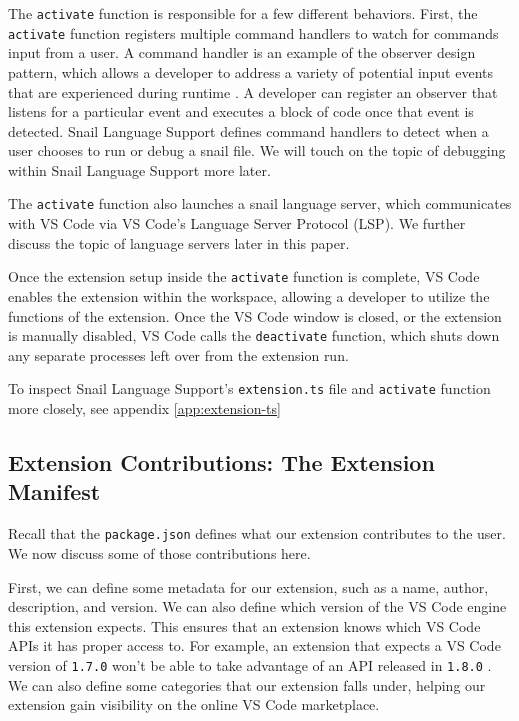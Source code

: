 \documentclass{article}
\begin{document}
The \lstinline{activate} function is responsible for a few different behaviors. First, the \lstinline{activate} function registers multiple command handlers to watch for commands input from a user. A command handler is an example of the observer design pattern, which allows a developer to address a variety of potential input events that are experienced during runtime \cite{GangOfFour_1995}. A developer can register an observer that listens for a particular event and executes a block of code once that event is detected. Snail Language Support defines command handlers to detect when a user chooses to run or debug a snail file. We will touch on the topic of debugging within Snail Language Support more later. 

The \lstinline{activate} function also launches a snail language server, which communicates with VS Code via VS Code's Language Server Protocol (LSP). We further discuss the topic of language servers later in this paper.

Once the extension setup inside the \lstinline{activate} function is complete, VS Code enables the extension within the workspace, allowing a developer to utilize the functions of the extension. Once the VS Code window is closed, or the extension is manually disabled, VS Code calls the \lstinline{deactivate} function, which shuts down any separate processes left over from the extension run.

To inspect Snail Language Support's \lstinline{extension.ts} file and \lstinline{activate} function more closely, see appendix \ref{app:extension-ts}

\subsection{Extension Contributions: The Extension Manifest}

Recall that the \lstinline{package.json} defines what our extension contributes to the user. We now discuss some of those contributions here.

First, we can define some metadata for our extension, such as a name, author, description, and version. We can also define which version of the VS Code engine this extension expects. This ensures that an extension knows which VS Code APIs it has proper access to. For example, an extension that expects a VS Code version of \lstinline{1.7.0} won't be able to take advantage of an API released in \lstinline{1.8.0} \cite{Microsoft_2023e}. We can also define some categories that our extension falls under, helping our extension gain visibility on the online VS Code marketplace.
\end{document}
